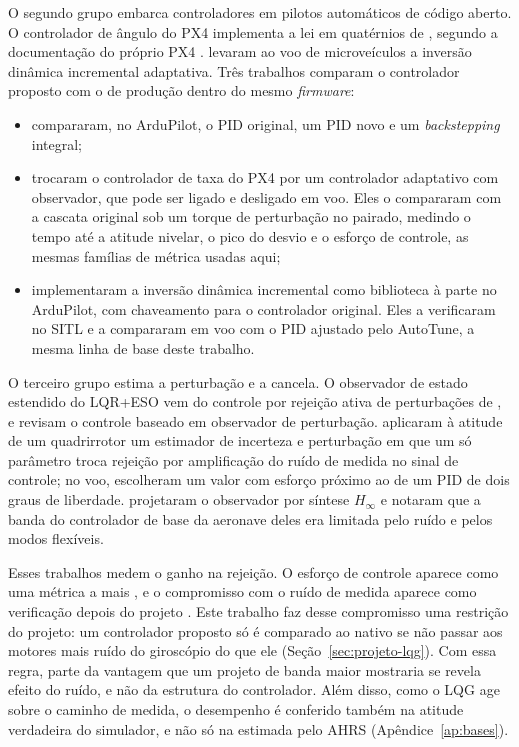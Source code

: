 O segundo grupo embarca controladores em pilotos automáticos de código aberto.
O controlador de ângulo do PX4 implementa a lei em quatérnios de
, segundo a documentação do próprio PX4
\cite{px4controladores}.  levaram ao voo de
microveículos a inversão dinâmica incremental adaptativa. Três trabalhos
comparam o controlador proposto com o de produção dentro do mesmo
\textit{firmware}:
\begin{itemize}
\item {} compararam, no ArduPilot, o PID original, um
PID novo e um \textit{backstepping} integral;
\item {} trocaram o controlador de taxa do PX4 por um
controlador adaptativo com observador, que pode ser ligado e desligado em
voo. Eles o compararam com a cascata original sob um torque de perturbação no
pairado, medindo o tempo até a atitude nivelar, o pico do desvio e o esforço
de controle, as mesmas famílias de métrica usadas aqui;
\item {} implementaram a inversão dinâmica incremental
como biblioteca à parte no ArduPilot, com chaveamento para o controlador
original. Eles a verificaram no SITL e a compararam em voo com o PID ajustado
pelo AutoTune, a mesma linha de base deste trabalho.
\end{itemize}

O terceiro grupo estima a perturbação e a cancela. O observador de estado
estendido do LQR+ESO vem do controle por rejeição ativa de perturbações de
, e  revisam o controle baseado em
observador de perturbação.  aplicaram à atitude de um
quadrirrotor um estimador de incerteza e perturbação em que um só parâmetro
troca rejeição por amplificação do ruído de medida no sinal de controle; no
voo, escolheram um valor com esforço próximo ao de um PID de dois graus de
liberdade.  projetaram o observador por síntese
$H_\infty$ e notaram que a banda do controlador de base da aeronave deles
era limitada pelo ruído e pelos modos flexíveis.

Esses trabalhos medem o ganho na rejeição. O esforço de controle aparece como
uma métrica a mais \cite{bressan2020}, e o compromisso com o ruído de medida
aparece como verificação depois do projeto \cite{sanz2016}. Este trabalho faz
desse compromisso uma restrição do projeto: um controlador proposto só é
comparado ao nativo se não passar aos motores mais ruído do giroscópio do
que ele (Seção~\ref{sec:projeto-lqg}). Com essa regra, parte da vantagem que
um projeto de banda maior mostraria se revela efeito do ruído, e não da
estrutura do controlador. Além disso, como o LQG age sobre o caminho de medida, o
desempenho é conferido também na atitude verdadeira do simulador, e não só
na estimada pelo AHRS (Apêndice~\ref{ap:bases}).

